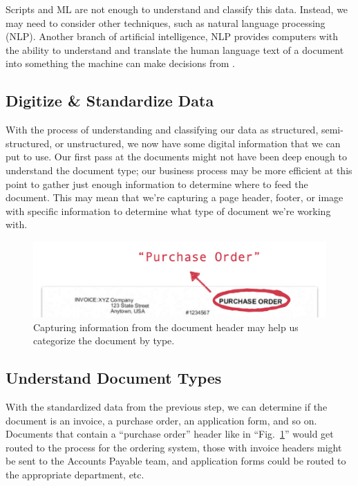 \documentclass[conference]{IEEEtran}
\begin{document}
Scripts and ML are not enough to understand and classify this data. Instead, we may need to consider other techniques, such as natural language processing (NLP). Another branch of artificial intelligence, NLP provides computers with the ability to understand and translate the human language text of a document into something the machine can make decisions from \cite{ibm:nlp}.

\subsection{Digitize \& Standardize Data}
With the process of understanding and classifying our data as structured, semi-structured, or unstructured, we now have some digital information that we can put to use. Our first pass at the documents might not have been deep enough to understand the document type; our business process may be more efficient at this point to gather just enough information to determine where to feed the document. This may mean that we're capturing a page header, footer, or image with specific information to determine what type of document we're working with. 

\begin{figure}[ht]
\centerline{\includegraphics[width=\columnwidth]{DocumentHeader.png}}
\caption{Capturing information from the document header may help us categorize the document by type.}
\label{figDocumentHeader}
\end{figure}

\subsection{Understand Document Types}
With the standardized data from the previous step, we can determine if the document is an invoice, a purchase order, an application form, and so on. Documents that contain a ``purchase order'' header like in ``Fig.~\ref{figDocumentHeader}'' would get routed to the process for the ordering system, those with invoice headers might be sent to the Accounts Payable team, and application forms could be routed to the appropriate department, etc.
\end{document}
